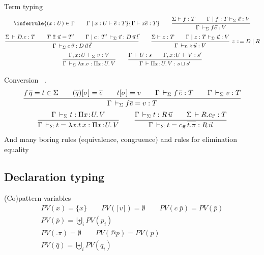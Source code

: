 \documentclass[acmlarge,fleqn]{acmart}\settopmatter{}
\begin{document}
Term typing 
\begin{gather*}
\inferrule
  {(x:U)\in \Gamma \qquad \Gamma \mid x:U \vdash \overline{e}:T}
  {\Gamma \vdash x \overline{e} : T}
\qquad
\ru{\Sigma \vdash f : T \qquad
    \Gamma \mid f : T \vdash_\Sigma \vec e : V
   }{\Gamma \der_\Sigma f \vec e : V}
\\
\ru{\Sigma \der D.c : T \qquad
    T \twobang \vec u = T' \qquad
    \Gamma \mid c : T' \der_\Sigma \vec v : D \, \vec u \, \vec t
  }{\Gamma \der_\Sigma c\,\vec v : D\,\vec u\,\vec t}
\qquad
\ru{\Sigma \vdash z : T \qquad
    \Gamma \mid z : T \vdash_\Sigma \vec u : V
   }{\Gamma \der_\Sigma z \, \vec u : V} \ z ::= D \mid R
\\
\ru{\Gamma, x \of U \der_\Sigma v : V
  }{\Gamma \der_\Sigma \lambda x.v : \funT x U V}
\qquad
\ru{\Gamma \der U : s \qquad
    \Gamma, x \of U \der V : s'
  }{\Gamma \der \piT x U V : s \sqcup s'}
\end{gather*}


Conversion
\ .
\begin{gather*}
%
\ru{f\,\overline q = t \in \Sigma \qquad
    (\overline q)[\sigma] = \overline e \qquad
    t[\sigma] = v \qquad
    \Gamma \ders f\,\overline e : T \qquad
    \Gamma \ders v : T
  }{\Gamma \ders f \overline e = v : T}
\\
\ru{\Gamma \ders t : \funT x U V
  }{\Gamma \ders t = \lambda x. t\, x : \funT x U V}
\qquad
\ru{\Gamma \ders t : R\, \vec u \qquad
    \Sigma \der R.\cpi : T
  }{\Gamma \ders t = \cpi\,\overline{t .\pi} : R\,\vec u}
\\
\end{gather*}
And many boring rules (equivalence, congruence)
and rules for elimination equality


\subsection{Declaration typing}

(Co)pattern variables 
\begin{gather*}
PV(x) = \{ x \} \qquad PV (\lceil v \rceil) = \emptyset \qquad PV(c\; \bar{p}) = PV(\bar{p}) \\
PV(\bar{p}) = \biguplus_i PV(p_i) \\
PV(.\pi) = \emptyset \qquad PV(@p) = PV(p) \\
PV(\bar{q}) = \biguplus_i PV(q_i) \\
\end{gather*}
\end{document}
